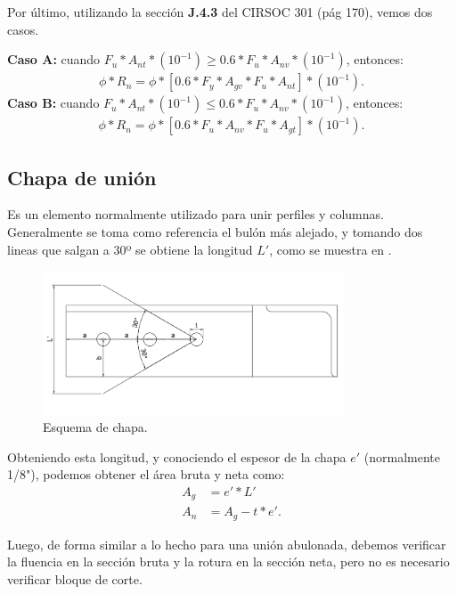 \documentclass[../main.tex]{subfiles}
\begin{document}
\begin{description}
    Por último, utilizando la sección \textbf{J.4.3} del CIRSOC 301 (pág 170), 
    vemos dos casos.

    \textbf{Caso A:} cuando
    $F_u * A_{nt} * (10^{-1}) \geq 0.6 * F_u * A_{nv} * (10^{-1})$, entonces:
    \begin{align*}
      \phi * R_n = \phi * [0.6 * F_y * A_{gv} * F_u * A_{nt}] * (10^{-1})
    .\end{align*}
    \textbf{Caso B:} cuando
    $F_u * A_{nt} * (10^{-1}) \leq 0.6 * F_u * A_{nv} * (10^{-1})$, entonces:
    \begin{align*}
      \phi * R_n = \phi * [0.6 * F_u * A_{nv} * F_u * A_{gt}] * (10^{-1})
    .\end{align*}
\end{description}

\subsection{Chapa de unión}

Es un elemento normalmente utilizado para unir perfiles y columnas. Generalmente
se toma como referencia el bulón más alejado, y tomando dos lineas que salgan
a 30º se obtiene la longitud $L'$, como se muestra en .

\begin{figure}[htpb]
  \centering
  \includegraphics[width=0.8\textwidth]{../images/resumen/chapa}
  \caption{Esquema de chapa.}
  \label{fig:chapa}
\end{figure}

Obteniendo esta longitud, y conociendo el espesor de la chapa $e'$
(normalmente 1/8"), podemos obtener el área bruta y neta como:
\begin{align*}
  A_g &=  e' * L' \\[5pt]
  A_n &= A_g - t * e'
.\end{align*}

Luego, de forma similar a lo hecho para una unión abulonada, debemos verificar
la fluencia en la sección bruta y la rotura en la sección neta, pero no es
necesario verificar bloque de corte.
\end{document}
